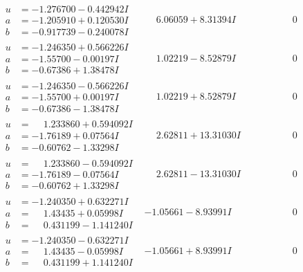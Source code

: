 \documentclass[1p]{elsarticle_modified}
\theoremstyle{definition}
\begin{document}
$$\begin{array}{c|c|c}
\begin{aligned}
u &= -1.276700 - 0.442942 I \\
a &= -1.205910 + 0.120530 I \\
b &= -0.917739 - 0.240078 I\end{aligned}
 & \phantom{-}6.06059 + 8.31394 I & \phantom{-0.000000 } 0 \\ \hline\begin{aligned}
u &= -1.246350 + 0.566226 I \\
a &= -1.55700 - 0.00197 I \\
b &= -0.67386 + 1.38478 I\end{aligned}
 & \phantom{-}1.02219 - 8.52879 I & \phantom{-0.000000 } 0 \\ \hline\begin{aligned}
u &= -1.246350 - 0.566226 I \\
a &= -1.55700 + 0.00197 I \\
b &= -0.67386 - 1.38478 I\end{aligned}
 & \phantom{-}1.02219 + 8.52879 I & \phantom{-0.000000 } 0 \\ \hline\begin{aligned}
u &= \phantom{-}1.233860 + 0.594092 I \\
a &= -1.76189 + 0.07564 I \\
b &= -0.60762 - 1.33298 I\end{aligned}
 & \phantom{-}2.62811 + 13.31030 I & \phantom{-0.000000 } 0 \\ \hline\begin{aligned}
u &= \phantom{-}1.233860 - 0.594092 I \\
a &= -1.76189 - 0.07564 I \\
b &= -0.60762 + 1.33298 I\end{aligned}
 & \phantom{-}2.62811 - 13.31030 I & \phantom{-0.000000 } 0 \\ \hline\begin{aligned}
u &= -1.240350 + 0.632271 I \\
a &= \phantom{-}1.43435 + 0.05998 I \\
b &= \phantom{-}0.431199 - 1.141240 I\end{aligned}
 & -1.05661 - 8.93991 I & \phantom{-0.000000 } 0 \\ \hline\begin{aligned}
u &= -1.240350 - 0.632271 I \\
a &= \phantom{-}1.43435 - 0.05998 I \\
b &= \phantom{-}0.431199 + 1.141240 I\end{aligned}
 & -1.05661 + 8.93991 I & \phantom{-0.000000 } 0 \\ \hline\begin{aligned}

\end{aligned}
\end{array}$$
\end{document}
